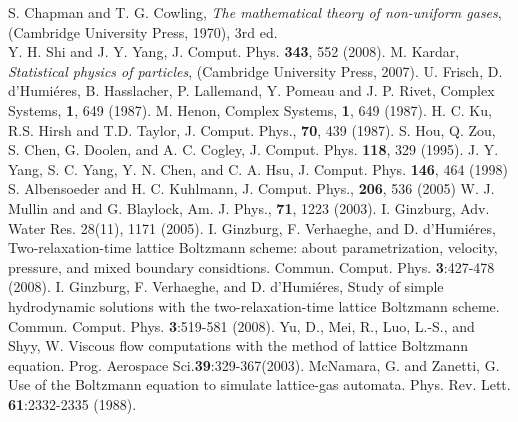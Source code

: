\documentclass[doublecol]{epl2}
\begin{document}
\begin{thebibliography}{0}
 S. Chapman and  T. G. Cowling, {\sl The mathematical theory of non-uniform gases}, (Cambridge University Press, 1970), 3rd ed. \\
 Y. H. Shi and J. Y. Yang, J. Comput. Phys. {\bf 343}, 552 (2008).
 M. Kardar, {\sl Statistical physics of particles}, (Cambridge University Press, 2007).
 U. Frisch, D. d'Humi\'{e}res, B. Hasslacher, P. Lallemand, Y. Pomeau and J. P. Rivet, Complex Systems, {\bf 1}, 649 (1987).
 M. Henon, Complex Systems, {\bf 1}, 649 (1987).
 H. C. Ku, R.S. Hirsh and T.D. Taylor, J. Comput. Phys., {\bf 70}, 439 (1987).
S. Hou, Q. Zou, S. Chen, G. Doolen, and A. C. Cogley, J. Comput. Phys. {\bf 118}, 329 (1995).
J. Y. Yang, S. C. Yang, Y. N. Chen, and C. A. Hsu, J. Comput. Phys. {\bf 146}, 464 (1998)
 S. Albensoeder and H. C. Kuhlmann, J. Comput. Phys., {\bf 206}, 536 (2005)
 W. J. Mullin and and G. Blaylock, Am. J. Phys., {\bf 71}, 1223 (2003).
I. Ginzburg, Adv. Water Res. 28(11), 1171 (2005).
 I. Ginzburg, F. Verhaeghe, and D. d'Humi\'{e}res, Two-relaxation-time lattice Boltzmann scheme: about parametrization, velocity, pressure, and mixed boundary considtions.  Commun. Comput. Phys. {\bf 3}:427-478 (2008).
 I. Ginzburg, F. Verhaeghe, and D. d'Humi\'{e}res,
Study of simple hydrodynamic solutions with the two-relaxation-time lattice Boltzmann scheme.  Commun. Comput. Phys. {\bf 3}:519-581 (2008).
 Yu, D., Mei, R., Luo, L.-S., and Shyy, W. Viscous flow computations
with the method of lattice Boltzmann equation. Prog. Aerospace Sci.{\bf 39}:329-367(2003).
 McNamara, G. and Zanetti, G. Use of the Boltzmann equation to simulate
lattice-gas automata. Phys. Rev. Lett. {\bf 61}:2332-2335 (1988).

\end{thebibliography}
\end{document}
